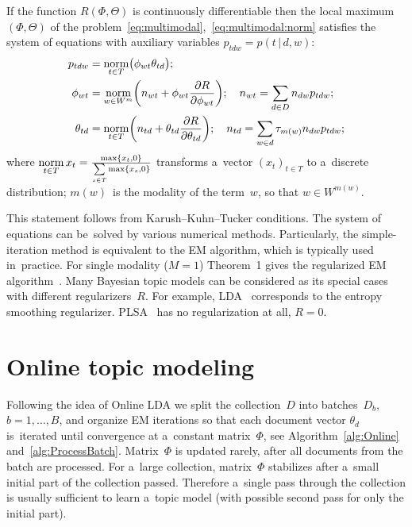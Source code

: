 \documentclass{llncs}
\newcommand{\norm}{\mathop{\rm norm}\limits}
\newcommand{\cond}{\mspace{3mu}{|}\mspace{3mu}}
\begin{document}
\begin{theorem}
\label{th:multimodal}
    If the function $R(\Phi,\Theta)$ is continuously differentiable
    then the local maximum $(\Phi,\Theta)$
    of the problem~\eqref{eq:multimodal},~\eqref{eq:multimodal:norm}
    satisfies the system of equations
    with auxiliary variables $p_{tdw} = p(t\cond d,w)$:
    \begin{align}
        \label{eq:Estep}
        p_{tdw} &= \norm_{t\in T} \bigl(\phi_{wt}\theta_{td}\bigr);
    \\
        \label{eq:Mstep:phi}
        \phi_{wt} &= \norm_{w\in W^m}
            \biggl(
                n_{wt} + \phi_{wt} \frac{\partial R}{\partial \phi_{wt}}
            \biggr);
        \quad
        n_{wt} = \sum_{d\in D} n_{dw} p_{tdw};
    \\
        \label{eq:Mstep:theta}
        \theta_{td} &= \norm_{t\in T}
            \biggl(
                n_{td} + \theta_{td} \frac{\partial R}{\partial \theta_{td}}
            \biggr);
        \quad
        n_{td} = 
            \sum_{w\in d} \tau_{m(w)} n_{dw} p_{tdw};
    \end{align}
    where 
    $\norm_{t\in T} x_t = \frac{\max\{x_t,0\}}{\sum\limits_{s\in T} \max\{x_s,0\}}$ 
    transforms a~vector $(x_t)_{t\in T}$ to a~discrete distribution;
    $m(w)$~is the modality of the term~$w$, so that $w\in W^{m(w)}$.
\end{theorem}

This statement follows from Karush--Kuhn--Tucker conditions.
The system of equations can be~solved by various numerical methods.
Particularly,
the simple-iteration method is equivalent to the EM algorithm,
which is typically used in~practice.
For single modality (${M=1}$) Theorem~1 gives the regularized EM algorithm~\cite{voron14aist,voron14mlj}.
Many Bayesian topic models can be considered as its special cases with different regularizers~$R$. 
For example, 
LDA~\cite{blei03latent} corresponds to the entropy smoothing regularizer.
PLSA~\cite{hofmann99plsi} has no regularization at all, ${R=0}$.

\section{Online topic modeling}
\label{sec:Online}

Following the idea of Online LDA \cite{hoffman10online}
we split the collection~$D$ into batches~$D_b$, ${b=1,\dots,B}$,
and organize EM iterations so that 
each document vector $\theta_d$ is~iterated until convergence at a~constant matrix~$\Phi$,
see Algorithm~\ref{alg:Online} and~\ref{alg:ProcessBatch}.
Matrix~$\Phi$ is updated rarely, after all documents from the batch are processed.
For a~large collection, 
matrix~$\Phi$ stabilizes after a~small initial part of the collection passed.
Therefore a~single pass through the collection is usually sufficient to learn a~topic model
(with possible second pass for only the initial part).
\end{document}
